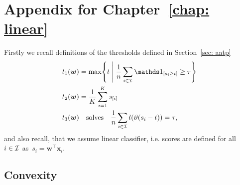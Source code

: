 \chapter{Appendix for Chapter~\ref{chap: linear}}

Firstly we recall definitions of the thresholds defined in Section~\ref{sec: aatp}
\begin{equation*}
  \begin{aligned}
    t_1(\bm{w}) & = \max \Set{t}{\frac{1}{n} \sum_{i \in \I} \Iverson{s_i \geq t} \geq \tau} \\
    t_2(\bm{w}) & = \frac{1}{K} \sum_{i=1}^{K} s_{[i]} \\
    t_3(\bm{w}) & \quad \text{solves} \quad \frac{1}{n} \sum_{i \in \I} l\Brac{\vartheta(s_i - t)} = \tau, \\
  \end{aligned}
\end{equation*}
and also recall, that we assume linear classifier, i.e. scores are defined for all~$i \in \mathcal{I}$ as~$s_i = \bm{w}^{\top} \bm{x}_i.$

\section{Convexity}

